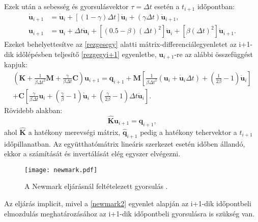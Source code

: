 Ezek után  a sebesség és gyorsulásvektor $\tau = \Delta{t}$ esetén a $t_{i+1}$ időpontban:
%
\begin{subequations}
\begin{align}
\mathbf{\dot{u}}_{i+1}& =  \mathbf{\dot{u}}_i+[(1-\gamma)\Delta{t}]\mathbf{\ddot{u}}_i+(\gamma\Delta{t})\mathbf{\ddot{u}}_{i+1},   \label{newmark1}\\ 
\mathbf{u}_{i+1}& =  \mathbf{u}_i+\Delta{t}\mathbf{\dot{u}}_i+\left[(0.5-\beta)
(\Delta{t})^2\right]\mathbf{\ddot{u}}_i+\left[\beta(\Delta{t})^2\right]\mathbf{\ddot{u}}_{i+1}. \label{newmark2}
\end{align}
\end{subequations}
% 
Ezeket behelyettesítve az \eqref{rezgesegy} alatti mátrix-differenciálegyenletet az i+1-dik időlépésben teljesítő \eqref{rezgegyi+1} egyenletbe, $\mathbf{u}_{i+1}$-re az alábbi összefüggést kapjuk:
%
\begin{equation}
\label{newmark long}
\begin{split}
\left(\mathbf{K}+\frac{1}{\beta\Delta{t}^2}\mathbf{M}+\frac{\gamma}{\beta\Delta{t}}\mathbf{C}\right)\mathbf{u}_{i+1} = \mathbf{q}_{i+1}+\mathbf{M}\left[\frac{1}{\beta\Delta{t}^2}\left(\mathbf{u}_i+\mathbf{\dot{u}}_i\Delta{t}\right)+\left( \frac{1}{2\beta}-1\right)\mathbf{\ddot{u}}_i\right]        \\ +\mathbf{C}\left[\frac{\gamma}{\beta\Delta{t}}\mathbf{u}_i+\left(\frac{\gamma}{\beta}-1\right)\mathbf{\dot{u}}_i+\left(\frac{\gamma}{2\beta}-1\right)\Delta{t}\mathbf{\ddot{u}}_i\right].
\end{split}
\end{equation}
%
Rövidebb alakban:
\begin{equation}
\label{newmark short}
\mathbf{\hat{K}}\mathbf{u}_{i+1} = \mathbf{\hat{q}}_{i+1},
\end{equation}
% 
ahol $\mathbf{\hat{K}}$ a hatékony merevségi mátrix, $\mathbf{\hat{q}}_{i+1}$ pedig a hatékony tehervektor a $t_{i+1}$ időpillanatban. Az együtthatómátrix lineáris szerkezet esetén időben állandó, ekkor a számítását és invertálását elég egyszer elvégezni.

\begin{figure}[h!]
\centering
\texttt{[image: newmark.pdf]}
\caption{A Newmark eljárásnál feltételezett gyorsulás \cite{gyorgyi}.}
\label{fig:newmark}
\end{figure}

Az eljárás implicit, mivel a \eqref{newmark2} egyenlet alapján az i+1-dik  időpontbeli elmozdulás meghatározásához az i+1-dik  időpontbeli gyorsulásra is szükség van.

